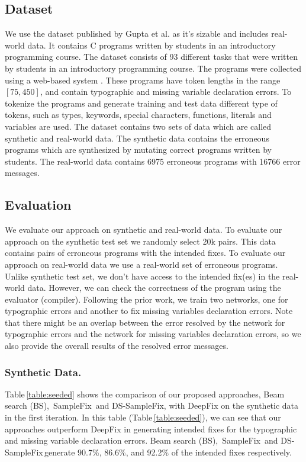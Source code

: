 \documentclass[runningheads]{llncs}
\newcommand{\samplefix}{SampleFix}
\newcommand{\dssmaplefix}{DS-SampleFix}
\newcommand{\tableref}{Table}
\begin{document}
\subsection{Dataset} 
We use the dataset published by Gupta et al. \cite{Gupta2017DeepFixFC} as it's sizable and includes real-world data. It contains C programs written by students in an introductory programming course. The dataset consists of 93 different tasks that were written by students in an introductory programming course. 
The programs were collected using a web-based system \cite{das16tutorin}. These programs have token lengths in the range $\left[75,450\right]$, and 
contain typographic and missing variable declaration errors. To tokenize the programs and generate training and test data  different type of tokens, such as types, keywords, special characters, functions, literals and variables are used. The dataset contains two sets of data which are called synthetic and real-world data. The synthetic data contains the erroneous programs which are synthesized by mutating correct programs written by students. The real-world data contains 6975 erroneous programs with 16766 error messages.
\subsection{Evaluation}
\label{subsec:eval}


We evaluate our approach on synthetic and real-world data. To evaluate our approach on the synthetic test set we randomly select 20k pairs. This data contains pairs of erroneous programs with the intended fixes. To evaluate our approach on real-world data we use a real-world set of erroneous programs. Unlike synthetic test set, we don't have access to the intended fix(es) in the real-world data. However, we can check the correctness of the program using the evaluator (compiler). Following the prior work, we train two networks, one for typographic errors and another to fix missing variables declaration errors. Note that there might be an overlap between the error resolved by the network for typographic errors and the network for missing variables declaration errors, so we also provide the overall results of the resolved error messages. 

\subsubsection{Synthetic Data.} 
\tableref \,\ref{table:seeded} shows the comparison of our proposed approaches, Beam search (BS), \,\samplefix \, and \dssmaplefix, with DeepFix \cite{Gupta2017DeepFixFC} on the synthetic data in the first iteration. In this table (\tableref \,\ref{table:seeded}), we can see that our approaches outperform DeepFix in generating intended fixes for the typographic and missing variable declaration errors. Beam search (BS), \,\samplefix \, and \dssmaplefix \,generate 90.7\%, 86.6\%, and 92.2\% of the intended fixes 
respectively. 
\end{document}

